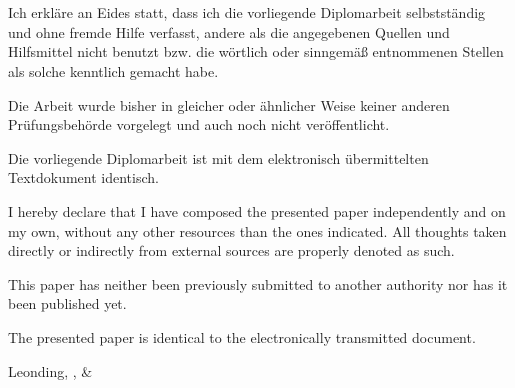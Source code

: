 \thispagestyle{empty}
\vspace{3cm}
~ \\ \\
{
Ich erkläre an Eides statt, dass ich die vorliegende Diplomarbeit selbstständig und ohne fremde Hilfe verfasst, andere als die angegebenen Quellen und Hilfsmittel nicht benutzt bzw. die wörtlich oder sinngemäß entnommenen Stellen als solche kenntlich gemacht habe.

Die Arbeit wurde bisher in gleicher oder ähnlicher Weise keiner anderen Prüfungsbehörde vorgelegt und auch noch nicht veröffentlicht.

Die vorliegende Diplomarbeit ist mit dem elektronisch übermittelten Textdokument identisch.
}
{
I hereby declare that I have composed the presented paper independently and on my own, without any other resources than the ones indicated. 
All thoughts taken directly or indirectly from external sources are properly denoted as such.

This paper has neither been previously submitted to another authority nor has it been published yet.

The presented paper is identical to the electronically transmitted document.
}
\vspace{3cm}
\begin{tabbing}
Leonding,  \hspace{2cm} {\firstauthor}, {\secondauthor} \& {\thirdauthor} %
\end{tabbing}
\vspace{10cm}
\newpage
\setcounter{page}{1}
